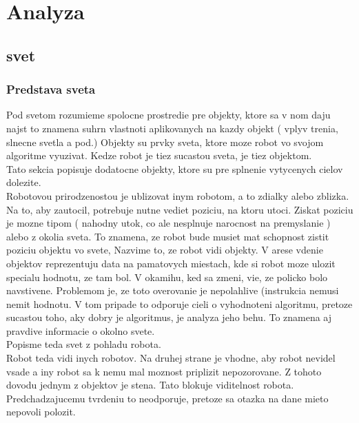 \documentclass[a4paper,11pt,final]{report}
\begin{document}
\chapter{Analyza}
\section{svet}
\subsection{Predstava sveta}
Pod svetom rozumieme spolocne prostredie pre objekty, ktore sa v nom daju najst to znamena suhrn vlastnoti aplikovanych na kazdy objekt ( vplyv trenia, slnecne svetla a pod.) Objekty su prvky sveta, ktore moze robot vo svojom algoritme vyuzivat. Kedze robot je tiez sucastou sveta, je tiez objektom.\\ %
Tato sekcia popisuje dodatocne objekty, ktore su pre splnenie vytycenych cielov dolezite. \\
Robotovou prirodzenostou je ublizovat inym robotom, a to zdialky alebo zblizka. Na to, aby zautocil, potrebuje nutne vediet poziciu, na ktoru utoci. Ziskat poziciu je mozne tipom ( nahodny utok, co ale nesplnuje narocnost na premyslanie ) alebo z okolia sveta. To znamena, ze robot bude musiet mat schopnost zistit poziciu objektu vo svete, Nazvime to, ze robot vidi objekty. V arese vdenie objektov reprezentuju data na pamatovych miestach, kde si robot moze ulozit specialu hodnotu, ze tam bol. V okamihu, ked sa zmeni, vie, ze policko bolo navstivene. Problemom je, ze toto overovanie je nepolahlive (instrukcia nemusi nemit hodnotu. V tom pripade to odporuje cieli o vyhodnoteni algoritmu, pretoze sucastou toho, aky dobry je algoritmus, je analyza jeho behu. To znamena aj pravdive informacie o okolno svete. \\ %
Popisme teda svet z pohladu robota. \\
Robot teda vidi inych robotov. Na druhej strane je vhodne, aby robot nevidel vsade a iny robot sa k nemu mal moznost priplizit nepozorovane.%
Z tohoto dovodu jednym z objektov je stena. Tato blokuje viditelnost robota. Predchadzajucemu tvrdeniu to neodporuje, pretoze sa otazka na dane mieto nepovoli polozit.\\%
\end{document}
